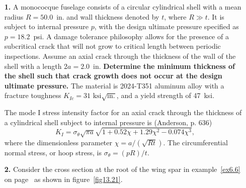 \documentclass{AeroStructure-ERJohnson}
\begin{document}
\begin{exercise}
\begin{enumerate}[\textbf{2.}]
\item[\textbf{1.}] A monococque fuselage consists of a circular cylindrical shell with a mean radius $\textit{R}=50.0$~in. and wall thickness denoted by $t$, where $R\gg t$. It is subject to internal pressure $p$, with the design ultimate pressure specified as $p= 18.2$~psi. A damage tolerance philosophy allows for the presence of a subcritical crack that will not grow to critical length between periodic inspections. Assume an axial crack through the thickness of the wall of the shell with a length $2a = 2.0$~in. \textbf{Determine the minimum thickness of the shell such that crack growth does not occur at the design ultimate pressure.} The material is 2024-T351 aluminum alloy with a fracture toughness $K_{I c}=31 \textrm{ ksi} \sqrt{\mathrm{in.}}$, and a yield strength of 47~ksi.

\smallskip

The mode I stress intensity factor for an axial crack through the thickness of a cylindrical shell subject to internal pressure is (Anderson, p. 636)
\begin{equation}
K_{I}=\sigma_{\theta} \sqrt{\pi a} \sqrt{1+0.52 \chi+1.29 \chi^{2}-0.074 \chi^{3}}, \label{eq13.6.a}\tag{a}
\end{equation}
where the dimensionless parameter $\chi=a /(\sqrt{R t})$. The circumferential normal stress, or hoop stress, is $\sigma_{\theta}=(p R) / t$.


\item[\textbf{2.}] Consider the cross section at the root of the wing spar in example~\ref{ex6.6} on page~\pageref{ex6.6} as shown in figure~\ref{fig13.21}.



\end{enumerate}
\end{exercise}
\end{document}
